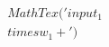 \documentclass[preview]{standalone}
\begin{document}
\begin{align*}
MathTex('input _ 1  \\times  w _ 1  +')
\end{align*}
\end{document}
